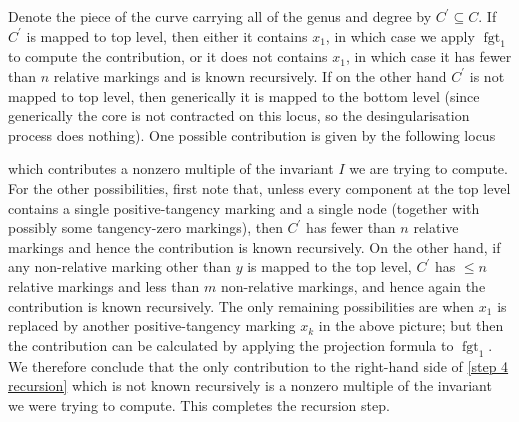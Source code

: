 \documentclass[11pt]{amsart}
\newcommand{\fgt}{\operatorname{fgt}}
\theoremstyle{definition}
\theoremstyle{definition}
\begin{document}
Denote the piece of the curve carrying all of the genus and degree by $C^\prime\subseteq C$. If $C^\prime$ is mapped to top level, then either it contains $x_1$, in which case we apply $\fgt_1$ to compute the contribution, or it does not contains $x_1$, in which case it has fewer than $n$ relative markings and is known recursively.  If on the other hand $C^\prime$ is not mapped to top level, then generically it is mapped to the bottom level (since generically the core is not contracted on this locus, so the desingularisation process does nothing). One possible contribution is given by the following locus
\begin{center}
\end{center}
which contributes a nonzero multiple of the invariant $I$ we are trying to compute. For the other possibilities, first note that, unless every component at the top level contains a single positive-tangency marking and a single node (together with possibly some tangency-zero markings), then $C^\prime$ has fewer than $n$ relative markings and hence the contribution is known recursively. On the other hand, if any non-relative marking other than $y$ is mapped to the top level, $C^\prime$ has $\leq n$ relative markings and less than $m$ non-relative markings, and hence again the contribution is known recursively. The only remaining possibilities are when $x_1$ is replaced by another positive-tangency marking $x_k$ in the above picture; but then the contribution can be calculated by applying the projection formula to $\fgt_{1}$. We therefore conclude that the only contribution to the right-hand side of \eqref{step 4 recursion} which is not known recursively is a nonzero multiple of the invariant we were trying to compute. This completes the recursion step.
\end{document}
